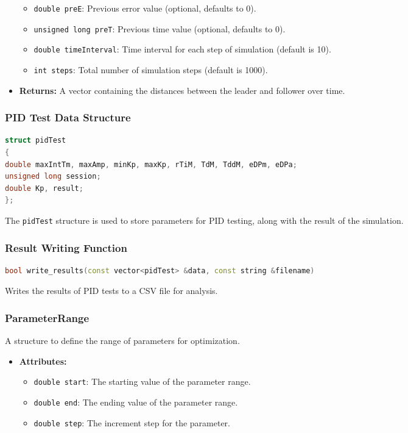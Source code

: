 \documentclass[a4paper,12pt]{report}
\begin{document}
\begin{lstlising}[language=C++]
\begin{itemize}
\begin{itemize}
\item \texttt{double preE}: Previous error value (optional, defaults to 0).
\item \texttt{unsigned long preT}: Previous time value (optional, defaults to 0).
\item \texttt{double timeInterval}: Time interval for each step of simulation (default is 10).
\item \texttt{int steps}: Total number of simulation steps (default is 1000).
\end{itemize}
\item \textbf{Returns:} A vector containing the distances between the leader and follower over time.
\end{itemize}
\subsubsection{PID Test Data Structure}
\begin{lstlisting}[language=cpp]
struct pidTest
{
double maxIntTm, maxAmp, minKp, maxKp, rTiM, TdM, TddM, eDPm, eDPa;
unsigned long session;
double Kp, result;
};
\end{lstlisting}
The \texttt{pidTest} structure is used to store parameters for PID testing, along with the result of the simulation.
\subsubsection{Result Writing Function}
\begin{lstlisting}[language=cpp]
bool write_results(const vector<pidTest> &data, const string &filename)
\end{lstlisting}
Writes the results of PID tests to a CSV file for analysis.
\subsubsection{ParameterRange}
A structure to define the range of parameters for optimization.
\begin{itemize}
\item \textbf{Attributes:}
\begin{itemize}
\item \texttt{double start}: The starting value of the parameter range.
\item \texttt{double end}: The ending value of the parameter range.
\item \texttt{double step}: The increment step for the parameter.
\end{itemize}
\end{itemize}

\end{lstlising}
\end{document}
